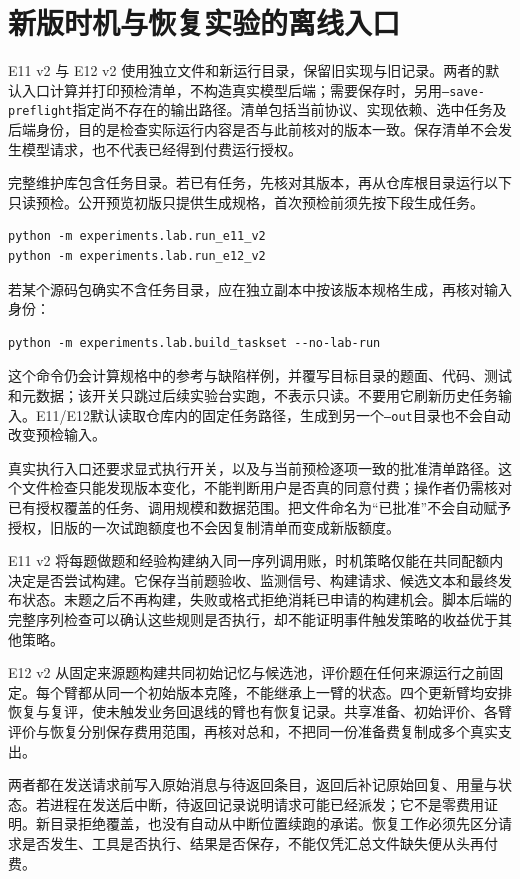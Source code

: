 \section{新版时机与恢复实验的离线入口}
\label{sec:appb-v2entry}

E11 v2 与 E12 v2 使用独立文件和新运行目录，保留旧实现与旧记录。两者的默认入口计算并打印预检清单，不构造真实模型后端；需要保存时，另用\texttt{--save-preflight}指定尚不存在的输出路径。清单包括当前协议、实现依赖、选中任务及后端身份，目的是检查实际运行内容是否与此前核对的版本一致。保存清单不会发生模型请求，也不代表已经得到付费运行授权。

完整维护库包含任务目录。若已有任务，先核对其版本，再从仓库根目录运行以下只读预检。公开预览初版只提供生成规格，首次预检前须先按下段生成任务。
\begin{verbatim}
python -m experiments.lab.run_e11_v2
python -m experiments.lab.run_e12_v2
\end{verbatim}

若某个源码包确实不含任务目录，应在独立副本中按该版本规格生成，再核对输入身份：
\begin{verbatim}
python -m experiments.lab.build_taskset --no-lab-run
\end{verbatim}
这个命令仍会计算规格中的参考与缺陷样例，并覆写目标目录的题面、代码、测试和元数据；该开关只跳过后续实验台实跑，不表示只读。不要用它刷新历史任务输入。E11/E12默认读取仓库内的固定任务路径，生成到另一个\texttt{--out}目录也不会自动改变预检输入。

真实执行入口还要求显式执行开关，以及与当前预检逐项一致的批准清单路径。这个文件检查只能发现版本变化，不能判断用户是否真的同意付费；操作者仍需核对已有授权覆盖的任务、调用规模和数据范围。把文件命名为“已批准”不会自动赋予授权，旧版的一次试跑额度也不会因复制清单而变成新版额度。

E11 v2 将每题做题和经验构建纳入同一序列调用账，时机策略仅能在共同配额内决定是否尝试构建。它保存当前题验收、监测信号、构建请求、候选文本和最终发布状态。末题之后不再构建，失败或格式拒绝消耗已申请的构建机会。脚本后端的完整序列检查可以确认这些规则是否执行，却不能证明事件触发策略的收益优于其他策略。

E12 v2 从固定来源题构建共同初始记忆与候选池，评价题在任何来源运行之前固定。每个臂都从同一个初始版本克隆，不能继承上一臂的状态。四个更新臂均安排恢复与复评，使未触发业务回退线的臂也有恢复记录。共享准备、初始评价、各臂评价与恢复分别保存费用范围，再核对总和，不把同一份准备费复制成多个真实支出。

两者都在发送请求前写入原始消息与待返回条目，返回后补记原始回复、用量与状态。若进程在发送后中断，待返回记录说明请求可能已经派发；它不是零费用证明。新目录拒绝覆盖，也没有自动从中断位置续跑的承诺。恢复工作必须先区分请求是否发生、工具是否执行、结果是否保存，不能仅凭汇总文件缺失便从头再付费。

